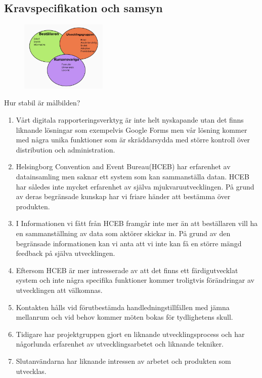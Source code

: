\documentclass{article}
\begin{document}
\subsection{Kravspecifikation och samsyn}

\begin{figure}[htp]
    \centering
    \includegraphics[width = 155px]{malbild.jpg}
    \label{fig:24}
\end{figure}

Hur stabil är målbilden?

\begin{enumerate}
	\item Vårt digitala rapporteringsverktyg är inte helt nyskapande utan det finns liknande
lösningar som exempelvis Google Forms men vår lösning kommer med några unika
funktioner som är skräddarsydda med större kontroll över distribution och
administration. 

	 \item Helsingborg Convention and Event Bureau(HCEB) har erfarenhet av datainsamling
men saknar ett system som kan sammanställa datan. HCEB har således inte
mycket erfarenhet av själva mjukvaruutvecklingen. På grund av deras begränsade kunskap har vi friare händer att bestämma över produkten.

\item I Informationen vi fått från HCEB framgår inte mer än att beställaren vill ha en sammanställning av data som aktörer skickar in. På grund av den begränsade informationen kan vi anta att vi inte kan få en större mängd feedback på själva utvecklingen.

\item Eftersom HCEB är mer intresserade av att det finns ett färdigutvecklat system och
inte några specifika funktioner kommer troligtvis förändringar av utvecklingen att
välkomnas.

\item Kontakten hålls vid förutbestämda handledningstillfällen med jämna mellanrum och
vid behov kommer möten bokas för tydlighetens skull.

\item Tidigare har projektgruppen gjort en liknande utvecklingsprocess och har någorlunda
erfarenhet av utvecklingsarbetet och liknande tekniker.

\item Slutanvändarna har liknande intressen av arbetet och produkten som utvecklas.
\end{enumerate}
\end{document}
